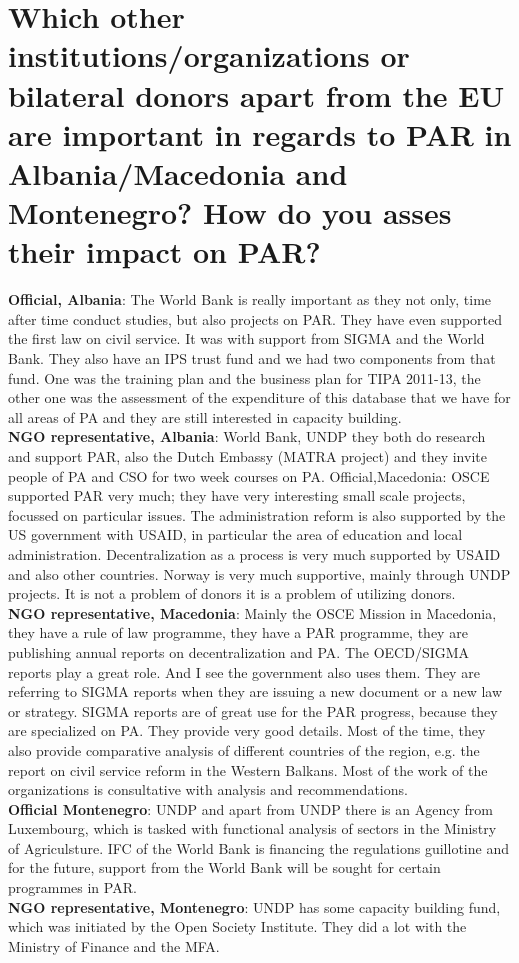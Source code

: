 \section{ Which other institutions/organizations or bilateral donors apart from the EU are important in regards to PAR in Albania/Macedonia and Montenegro? How do you asses their impact on PAR? }
\textbf{Official, Albania}: The World Bank is really important as they not only, time after time conduct studies, but also projects on PAR. They have even supported the first law on civil service. It was with support from SIGMA and the World Bank. They also have an IPS trust fund and we had two components from that fund. One was the training plan and the business plan for TIPA 2011-13, the other one was the assessment of the expenditure of this database that we have for all areas of PA and they are still interested in capacity building. \\
\textbf{NGO representative, Albania}: World Bank, UNDP they both do research and support PAR, also the Dutch Embassy (MATRA project) and they invite people of PA and CSO for two week courses on PA.
Official,Macedonia: OSCE supported PAR very much; they have very interesting small scale projects, focussed on particular issues. The administration reform is also supported by the US government with USAID, in particular the area of education and local administration. Decentralization as a process is very much supported by USAID and also other countries. Norway is very much supportive, mainly through UNDP projects. It is not a problem of donors it is a problem of utilizing donors.  \\
\textbf{NGO representative, Macedonia}: Mainly the OSCE Mission in Macedonia, they have a rule of law programme, they have a PAR programme, they are publishing annual reports on decentralization and PA. The OECD/SIGMA reports play a great role. And I see the government also uses them. They are referring to SIGMA reports when they are issuing a new document or a new law or strategy. SIGMA reports are of great use for the PAR progress, because they are specialized on PA. They provide very good details. Most of the time, they also provide comparative analysis of different countries of the region, e.g. the report on civil service reform in the Western Balkans. Most of the work of the organizations is consultative with analysis and recommendations. \\
\textbf{Official Montenegro}: UNDP and apart from UNDP there is an Agency from Luxembourg, which is tasked with functional analysis of sectors in the Ministry of Agriculsture. IFC of the World Bank is financing the regulations guillotine and for the future, support from the World Bank will be sought for certain programmes in PAR. \\
\textbf{NGO representative, Montenegro}: UNDP has some capacity building fund, which was initiated by the Open Society Institute. They did a lot with the Ministry of Finance and the MFA.%
